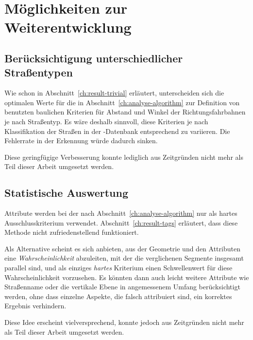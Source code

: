 \documentclass[../main/thesis.tex]{subfiles}
\begin{document}
\section{Möglichkeiten zur Weiterentwicklung}
\label{ch:improvements}



\subsection{Berücksichtigung unterschiedlicher Straßentypen}

Wie schon in Abschnitt~\ref{ch:result-trivial} erläutert, unterscheiden sich die optimalen Werte für die in Abschnitt~\ref{ch:analyse-algorithm} zur Definition von  benutzten baulichen Kriterien für Abstand und Winkel der Richtungsfahrbahnen je nach Straßentyp.
Es wäre deshalb sinnvoll, diese Kriterien je nach Klassifikation der Straßen in der \osm-Datenbank entsprechend zu variieren.
Die Fehlerrate in der Erkennung würde dadurch sinken.

Diese geringfügige Verbesserung konnte lediglich aus Zeitgründen nicht mehr als Teil dieser Arbeit umgesetzt werden.



\subsection{Statistische Auswertung}
\label{ch:improvements-stats}

Attribute werden bei der  nach Abschnitt~\ref{ch:analyse-algorithm} nur als hartes Ausschlusskriterium verwendet.
Abschnitt~\ref{ch:result-tags} erläutert, dass diese Methode nicht zufriedenstellend funktioniert.

Als Alternative scheint es sich anbieten, aus der Geometrie und den Attributen eine \emph{Wahrscheinlichkeit} abzuleiten, mit der die verglichenen Segmente insgesamt parallel sind, und als einziges \emph{hartes} Kriterium einen Schwellenwert für diese Wahrscheinlichkeit vorzusehen.
Es könnten dann auch leicht weitere Attribute wie Straßenname oder die vertikale Ebene in angemessenem Umfang berücksichtigt werden, ohne dass einzelne Aspekte, die falsch attribuiert sind, ein korrektes Ergebnis verhindern.

Diese Idee erscheint vielversprechend, konnte jedoch aus Zeitgründen nicht mehr als Teil dieser Arbeit umgesetzt werden.

\end{document}
